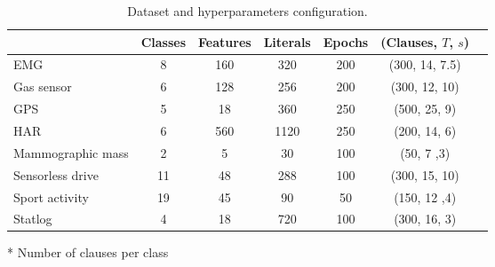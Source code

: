 \begin{table}[!htb]
	\centering
	\caption{Dataset and hyperparameters configuration.}
	\label{tab:dataset}
\vspace{-0.2cm}	
\resizebox{\linewidth}{!}
{
\begin{threeparttable}
	
	\begin{tabular}{l|cccccc}
	\hline 
	 & \textbf{Classes} & \textbf{Features} & \textbf{Literals} & \textbf{Epochs} & (\textbf{Clauses}\tnote{*}, $T$, $s$) \\ \hline
	 EMG & 8 & 160 & 320 & 200 & (300, 14, 7.5) \\
	 Gas sensor & 6 & 128 & 256 & 200 & (300, 12, 10)\\
	 GPS & 5 & 18 & 360 & 250 & (500, 25, 9)\\
	 HAR & 6 & 560 & 1120 & 250 & (200, 14, 6)\\
	 Mammographic mass & 2 & 5 & 30 & 100 & (50, 7 ,3)\\
	 Sensorless drive & 11 & 48 & 288 & 100 & (300, 15, 10)\\
	 Sport activity & 19 & 45 & 90 & 50 & (150, 12 ,4)\\
	 Statlog & 4 & 18 & 720 & 100 & (300, 16, 3)\\
	 \hline

	\end{tabular}

	\begin{tablenotes}
	\scriptsize
	\item[*] Number of clauses per class
	
	\end{tablenotes}

\end{threeparttable}
}

\end{table}